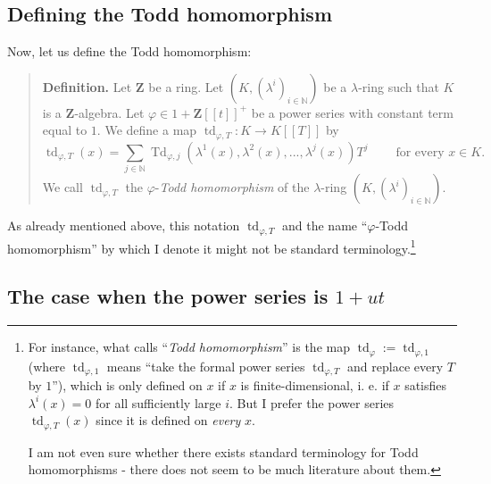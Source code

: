 \documentclass[numbers=enddot,12pt,final,onecolumn,notitlepage]{scrartcl}%
\begin{document}
\subsection{Defining the Todd homomorphism}

Now, let us define the Todd homomorphism:

\begin{quote}
\textbf{Definition.} Let $\mathbf{Z}$ be a ring. Let $\left(  K,\left(
\lambda^{i}\right)  _{i\in\mathbb{N}}\right)  $ be a $\lambda$-ring such that
$K$ is a $\mathbf{Z}$-algebra. Let $\varphi\in1+\mathbf{Z}\left[  \left[
t\right]  \right]  ^{+}$ be a power series with constant term equal to $1$. We
define a map $\operatorname*{td}_{\varphi,T}:K\rightarrow K\left[  \left[
T\right]  \right]  $ by%
\begin{equation}
\operatorname*{td}\nolimits_{\varphi,T}\left(  x\right)  =\sum\limits_{j\in
\mathbb{N}}\operatorname*{Td}\nolimits_{\varphi,j}\left(  \lambda^{1}\left(
x\right)  ,\lambda^{2}\left(  x\right)  ,...,\lambda^{j}\left(  x\right)
\right)  T^{j}\ \ \ \ \ \ \ \ \ \ \text{for every }x\in K. \label{ToddDef}%
\end{equation}
We call $\operatorname*{td}\nolimits_{\varphi,T}$ the $\varphi$-\textit{Todd
homomorphism} of the $\lambda$-ring $\left(  K,\left(  \lambda^{i}\right)
_{i\in\mathbb{N}}\right)  $.
\end{quote}

As already mentioned above, this notation $\operatorname*{td}%
\nolimits_{\varphi,T}$ and the name ``$\varphi$-Todd homomorphism'' by which I
denote it might not be standard terminology.\footnote{For instance, what
\cite{FulLan85} calls ``\textit{Todd homomorphism}'' is the map
$\operatorname*{td}_{\varphi}:=\operatorname*{td}\nolimits_{\varphi,1}$ (where
$\operatorname*{td}\nolimits_{\varphi,1}$ means ``take the formal power series
$\operatorname*{td}\nolimits_{\varphi,T}$ and replace every $T$ by $1$''),
which is only defined on $x$ if $x$ is finite-dimensional, i. e. if $x$
satisfies $\lambda^{i}\left(  x\right)  =0$ for all sufficiently large $i.$
But I prefer the power series $\operatorname*{td}\nolimits_{\varphi,T}\left(
x\right)  $ since it is defined on \textit{every }$x$.
\par
I am not even sure whether there exists standard terminology for Todd
homomorphisms - there does not seem to be much literature about them.}

\subsection{The case when the power series is $1+ut$}
\end{document}
